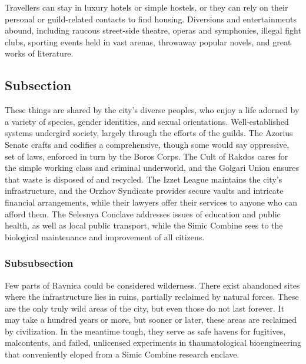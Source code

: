 Travellers can stay in luxury hotels or simple hostels, or they can rely on
their personal or guild-related contacts to find housing. 
Diversions and entertainments abound, including raucous street-side theatre,
operas and symphonies, illegal fight clubs, sporting events held in vast
arenas, throwaway popular novels, and great works of literature.

\subsection*{Subsection}
These things are shared by the city's diverse peoples, who enjoy a life adorned
by a variety of  species, gender identities, and sexual orientations.
Well-established systems undergird society, largely through the efforts of the
guilds. The Azorius Senate crafts and codifies a comprehensive, though some
would say oppressive, set of laws, enforced in turn by the Boros Corps. The Cult
of Rakdos cares for the simple working class and criminal underworld, and the
Golgari Union ensures that waste is disposed of and recycled. The Izzet League
maintains the city's infrastructure, and the Orzhov Syndicate provides secure
vaults and intricate financial arrangements, while their lawyers offer their
services to anyone who can afford them. The Selesnya Conclave addresses issues
of education and public health, as well as local public transport, while the
Simic Combine sees to the biological maintenance and improvement of all
citizens. 

\subsubsection*{Subsubsection}
Few parts of Ravnica could be considered wilderness. There exist abandoned sites
where the infrastructure lies in ruins, partially reclaimed by natural forces.
These are the only truly wild areas of the city, but even those do not last
forever. It may take a hundred years or more, but sooner or later, these areas
are reclaimed by civilization. In the meantime tough, they serve as safe havens
for fugitives, malcontents, and failed, unlicensed experiments in
thaumatological bioengineering that conveniently eloped from a Simic Combine
research enclave.

